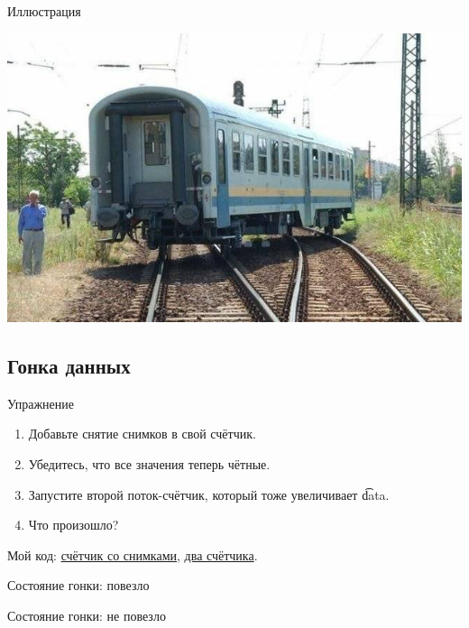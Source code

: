 \begin{frame}{Иллюстрация}
	\begin{center}
		\includegraphics[scale=0.6]{race-condition.jpg}
	\end{center}
\end{frame}

\subsection{Гонка данных}
\begin{frame}{Упражнение}
	\begin{enumerate}
		\item Добавьте снятие снимков в свой счётчик.
		\item Убедитесь, что все значения теперь чётные.
		\item Запустите второй поток-счётчик, который тоже увеличивает \t{data}.
		\item Что произошло?
	\end{enumerate}
	Мой код:
	\href{https://raw.githubusercontent.com/yeputons/spring-2019-paradigms/master/190410/sources/07-even-counter-snapshot.cpp}{счётчик со снимками},
	\href{https://raw.githubusercontent.com/yeputons/spring-2019-paradigms/master/190410/sources/08-two-threads.cpp}{два счётчика}.
\end{frame}

\begin{frame}[fragile]{Состояние гонки: повезло}
\end{frame}

\begin{frame}[fragile]{Состояние гонки: не повезло}
\end{frame}

